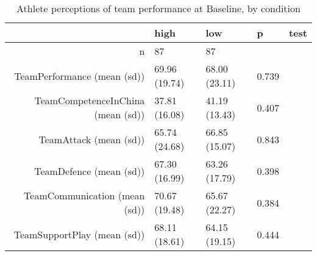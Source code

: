 \begin{table}[ht]
\centering
\begin{tabular}{rllll}
  \hline
 & high & low & p & test \\ 
  \hline
n &    87 &    87 &  &  \\ 
  TeamPerformance (mean (sd)) & 69.96 (19.74) & 68.00 (23.11) &  0.739 &  \\ 
  TeamCompetenceInChina (mean (sd)) & 37.81 (16.08) & 41.19 (13.43) &  0.407 &  \\ 
  TeamAttack (mean (sd)) & 65.74 (24.68) & 66.85 (15.07) &  0.843 &  \\ 
  TeamDefence (mean (sd)) & 67.30 (16.99) & 63.26 (17.79) &  0.398 &  \\ 
  TeamCommunication (mean (sd)) & 70.67 (19.48) & 65.67 (22.27) &  0.384 &  \\ 
  TeamSupportPlay (mean (sd)) & 68.11 (18.61) & 64.15 (19.15) &  0.444 &  \\ 
   \hline
\end{tabular}
\caption{Athlete perceptions of team performance 
 at Baseline, by condition} 
\label{tab:teamPerfBaselineTraining}
\end{table}
